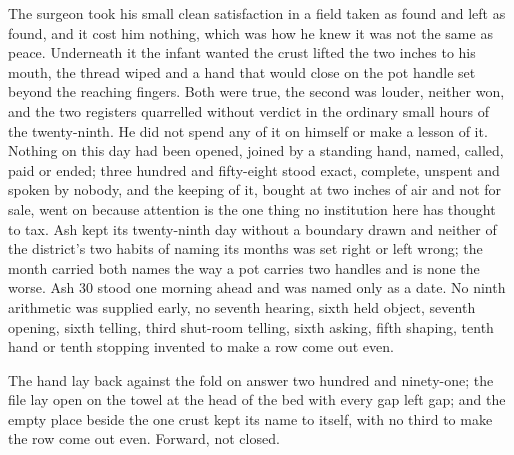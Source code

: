 The surgeon took his small clean satisfaction in a field taken as found and left as found, and it cost him nothing, which was how he knew it was not the same as peace. Underneath it the infant wanted the crust lifted the two inches to his mouth, the thread wiped and a hand that would close on the pot handle set beyond the reaching fingers. Both were true, the second was louder, neither won, and the two registers quarrelled without verdict in the ordinary small hours of the twenty-ninth. He did not spend any of it on himself or make a lesson of it. Nothing on this day had been opened, joined by a standing hand, named, called, paid or ended; three hundred and fifty-eight stood exact, complete, unspent and spoken by nobody, and the keeping of it, bought at two inches of air and not for sale, went on because attention is the one thing no institution here has thought to tax. Ash kept its twenty-ninth day without a boundary drawn and neither of the district's two habits of naming its months was set right or left wrong; the month carried both names the way a pot carries two handles and is none the worse. Ash 30 stood one morning ahead and was named only as a date. No ninth arithmetic was supplied early, no seventh hearing, sixth held object, seventh opening, sixth telling, third shut-room telling, sixth asking, fifth shaping, tenth hand or tenth stopping invented to make a row come out even.

The hand lay back against the fold on answer two hundred and ninety-one; the file lay open on the towel at the head of the bed with every gap left gap; and the empty place beside the one crust kept its name to itself, with no third to make the row come out even. Forward, not closed.

